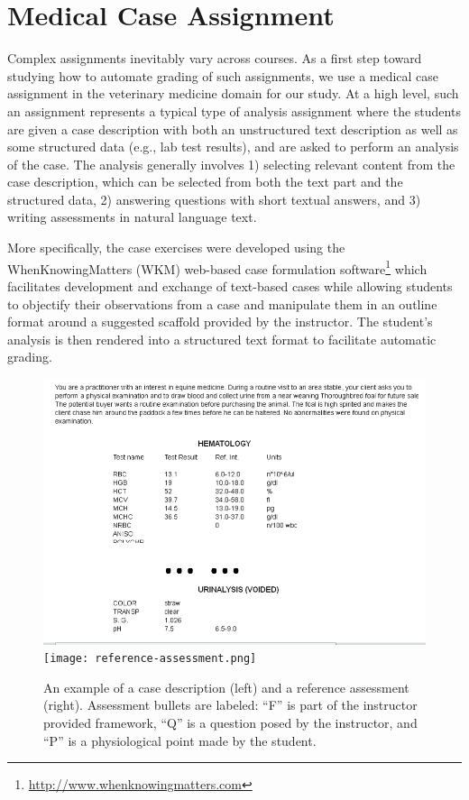 \section{Medical Case Assignment}

Complex assignments inevitably vary across courses. As a first step toward
studying how to automate grading of such assignments, we  use a medical
case assignment in the veterinary medicine domain for our study. At a high
level, such an assignment represents a typical type of analysis assignment
where the students are given a case description with both an unstructured
text description as well as some structured data (e.g., lab test results),
and are asked to perform an analysis of the case. The analysis generally
involves 1) selecting relevant content from the case description, which can
be selected from both the text part and the structured data, 2) answering
questions with short textual answers, and 3) writing assessments in
natural language text.

More specifically, the case exercises were developed using
the WhenKnowingMatters (WKM) web-based case formulation
software\footnote{\url{http://www.whenknowingmatters.com}} which
facilitates development and exchange of text-based cases while allowing
students to objectify their observations from a case and manipulate them in
an outline format around a suggested scaffold provided by the instructor.
The student's analysis is then rendered into a structured text format to
facilitate automatic grading.

\begin{figure}[ht]
\hspace{-15pt}
\includegraphics[scale=0.44]{case-desc-small.png}
\texttt{[image: reference-assessment.png]}
\caption{An example of a case description (left) and a reference assessment
(right). Assessment bullets are labeled: ``F'' is part of the instructor
provided framework, ``Q'' is a question posed by the instructor, and ``P''
is a physiological point made by the student.}
\label{fig:example}
\end{figure}

